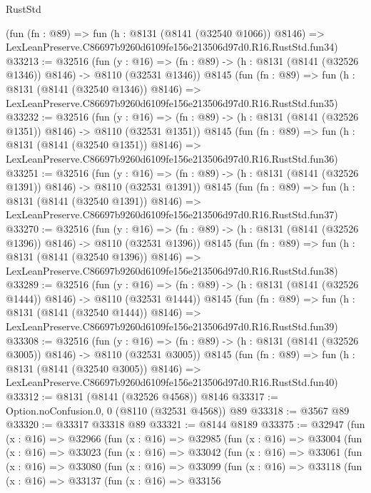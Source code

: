 \begin{lexlean}{RustStd}
\begin{coremodule}
    (fun (fn : @89) =>
    fun (h : @8131 (@8141 (@32540 @1066)) @8146) =>
    LexLeanPreserve.C86697b9260d6109fe156e213506d97d0.R16.RustStd.fun34)
@33213 := @32516
    (fun (y : @16) =>
    (fn : @89) -> (h : @8131 (@8141 (@32526 @1346)) @8146) -> @8110 (@32531 @1346))
    @8145
    (fun (fn : @89) =>
    fun (h : @8131 (@8141 (@32540 @1346)) @8146) =>
    LexLeanPreserve.C86697b9260d6109fe156e213506d97d0.R16.RustStd.fun35)
@33232 := @32516
    (fun (y : @16) =>
    (fn : @89) -> (h : @8131 (@8141 (@32526 @1351)) @8146) -> @8110 (@32531 @1351))
    @8145
    (fun (fn : @89) =>
    fun (h : @8131 (@8141 (@32540 @1351)) @8146) =>
    LexLeanPreserve.C86697b9260d6109fe156e213506d97d0.R16.RustStd.fun36)
@33251 := @32516
    (fun (y : @16) =>
    (fn : @89) -> (h : @8131 (@8141 (@32526 @1391)) @8146) -> @8110 (@32531 @1391))
    @8145
    (fun (fn : @89) =>
    fun (h : @8131 (@8141 (@32540 @1391)) @8146) =>
    LexLeanPreserve.C86697b9260d6109fe156e213506d97d0.R16.RustStd.fun37)
@33270 := @32516
    (fun (y : @16) =>
    (fn : @89) -> (h : @8131 (@8141 (@32526 @1396)) @8146) -> @8110 (@32531 @1396))
    @8145
    (fun (fn : @89) =>
    fun (h : @8131 (@8141 (@32540 @1396)) @8146) =>
    LexLeanPreserve.C86697b9260d6109fe156e213506d97d0.R16.RustStd.fun38)
@33289 := @32516
    (fun (y : @16) =>
    (fn : @89) -> (h : @8131 (@8141 (@32526 @1444)) @8146) -> @8110 (@32531 @1444))
    @8145
    (fun (fn : @89) =>
    fun (h : @8131 (@8141 (@32540 @1444)) @8146) =>
    LexLeanPreserve.C86697b9260d6109fe156e213506d97d0.R16.RustStd.fun39)
@33308 := @32516
    (fun (y : @16) =>
    (fn : @89) -> (h : @8131 (@8141 (@32526 @3005)) @8146) -> @8110 (@32531 @3005))
    @8145
    (fun (fn : @89) =>
    fun (h : @8131 (@8141 (@32540 @3005)) @8146) =>
    LexLeanPreserve.C86697b9260d6109fe156e213506d97d0.R16.RustStd.fun40)
@33312 := @8131 (@8141 (@32526 @4568)) @8146
@33317 := Option.noConfusion.{0, 0} (@8110 (@32531 @4568)) @89
@33318 := @3567 @89
@33320 := @33317 @33318 @89
@33321 := @8144 @8189
@33375 := @32947
    (fun (x : @16) =>
    @32966
      (fun (x : @16) =>
      @32985
        (fun (x : @16) =>
        @33004
          (fun (x : @16) =>
          @33023
            (fun (x : @16) =>
            @33042
              (fun (x : @16) =>
              @33061
                (fun (x : @16) =>
                @33080
                  (fun (x : @16) =>
                  @33099
                    (fun (x : @16) =>
                    @33118
                      (fun (x : @16) =>
                      @33137
                        (fun (x : @16) =>
                        @33156

\end{coremodule}
\end{lexlean}
